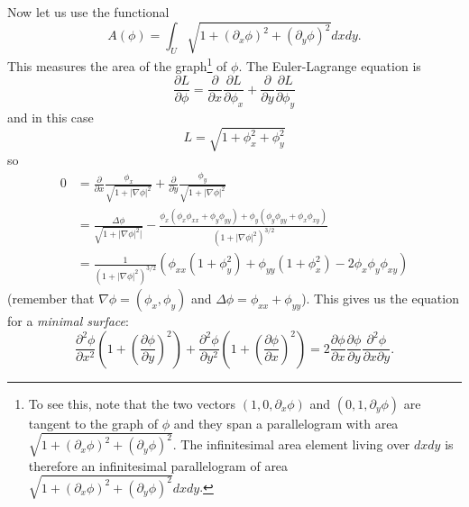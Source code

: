 \begin{exm}
Now let us use the functional
\[A(\phi)=\int_U\sqrt{1+(\partial_x\phi)^2+(\partial_y\phi)^2}dx dy.\]
This measures the area of the graph\footnote{To see this, note that the two vectors $(1,0,\partial_x\phi)$ and $(0,1,\partial_y\phi)$ are tangent to the graph of $\phi$ and they span a parallelogram with area $\sqrt{1+(\partial_x\phi)^2+(\partial_y\phi)^2}$. The infinitesimal area element living over $dx dy$ is therefore an infinitesimal parallelogram of area $\sqrt{1+(\partial_x\phi)^2+(\partial_y\phi)^2}dxdy$.} of $\phi$. The Euler-Lagrange equation is 
\[\frac{\partial L}{\partial\phi}=\frac{\partial}{\partial x}\frac{\partial L}{\partial\phi_x}+\frac{\partial}{\partial y}\frac{\partial L}{\partial\phi_y}\]
and in this case
\[L=\sqrt{1+\phi_x^2+\phi_y^2}\]
so
\begin{align*}
0&=\frac{\partial}{\partial x}\frac{\phi_x}{\sqrt{1+|\nabla\phi|^2}}+\frac{\partial}{\partial y}\frac{\phi_y}{\sqrt{1+|\nabla\phi|^2}}\\
&=\frac{\Delta\phi}{\sqrt{1+|\nabla\phi|^2|}}-\frac{\phi_x(\phi_x\phi_{xx}+\phi_y\phi_{yy})+\phi_y(\phi_y\phi_{yy}+\phi_x\phi_{xy})}{(1+|\nabla\phi|^2)^{3/2}}\\
&=\frac{1}{(1+|\nabla\phi|^2)^{3/2}}\left(\phi_{xx}(1+\phi_y^2)+\phi_{yy}(1+\phi_x^2)-2\phi_x\phi_y\phi_{xy}\right)
\end{align*}
(remember that $\nabla\phi=(\phi_x,\phi_y)$ and $\Delta\phi=\phi_{xx}+\phi_{yy}$). This gives us the equation for a {\em minimal surface}:
\[\frac{\partial^2\phi}{\partial x^2}\left(1+\left(\frac{\partial\phi}{\partial y}\right)^2\right)+\frac{\partial^2\phi}{\partial y^2}\left(1+\left(\frac{\partial\phi}{\partial x}\right)^2\right)=2\frac{\partial\phi}{\partial x}\frac{\partial\phi}{\partial y}\frac{\partial^2\phi}{\partial x\partial y}.\]
\end{exm}

